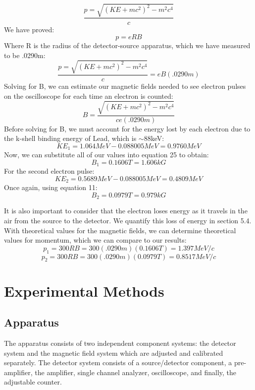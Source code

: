 \begin{equation}\frac{p=\sqrt{(KE+mc^2)^2-m^2c^4}}{c}\end{equation}
We have proved:
\begin{equation}p=eRB\end{equation}
Where R is the radius of the detector-source apparatus, which we have measured to be .0290m:
\begin{equation}\frac{p=\sqrt{(KE+mc^2)^2-m^2c^4}}{c}=eB(.0290m)\end{equation}
Solving for B, we can estimate our magnetic fields needed to see electron pulses on the oscilloscope for each time an electron is counted:
\begin{equation}B=\frac{\sqrt{(KE+mc^2)^2-m^2c^4}}{ce(.0290m)}\end{equation}
Before solving for B, we must account for the energy lost by each electron due to the k-shell binding energy of Lead, which is $\sim$88keV:
\begin{equation}KE_1=1.064MeV-0.088005MeV=0.9760 MeV\end{equation}
Now, we can substitute all of our values into equation 25 to obtain:
\begin{equation} B_1=0.1606T=1.606kG\end{equation}
For the second electron pulse:
\begin{equation}KE_2=0.5689MeV-0.088005MeV=0.4809MeV\end{equation}
Once again, using equation 11:
\begin{equation}B_2=0.0979T=0.979kG\end{equation}

It is also important to consider  that the electron loses energy as it travels in the air from the source to the detector. We quantify this loss of energy in section 5.4. With theoretical values for the magnetic fields, we can determine theoretical values for momentum, which we can compare to our results:
\begin{equation}p_1=300RB=300(.0290m)(0.1606T)=1.397 MeV/c\end{equation}
\begin{equation}p_2=300RB=300(.0290m)(0.0979T)=0.8517 MeV/c\end{equation}

\section{Experimental Methods}
\subsection{Apparatus}
The apparatus consists of two independent component systems: the detector system and the magnetic field system which are adjusted and calibrated separately.  The detector system consists of a source/detector component, a pre-amplifier, the amplifier, single channel analyzer, oscilloscope, and finally, the adjustable counter.

